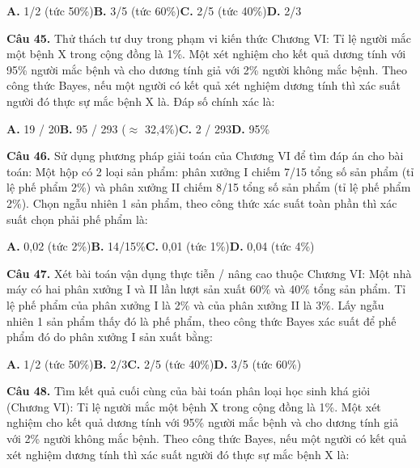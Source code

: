 \documentclass[11pt,a4paper]{article}
\begin{document}
\hspace*{1.5em}\textbf{A.} 1/2 (tức 50\%)\quad\quad \textbf{B.} 3/5 (tức 60\%)\quad\quad \textbf{C.} 2/5 (tức 40\%)\quad\quad \textbf{D.} 2/3\par\vspace{2pt}
\textbf{\color{primary} Câu 45.} Thử thách tư duy trong phạm vi kiến thức Chương VI: Tỉ lệ người mắc một bệnh X trong cộng đồng là 1\%. Một xét nghiệm cho kết quả dương tính với 95\% người mắc bệnh và cho dương tính giả với 2\% người không mắc bệnh. Theo công thức Bayes, nếu một người có kết quả xét nghiệm dương tính thì xác suất người đó thực sự mắc bệnh X là. Đáp số chính xác là:\par
\hspace*{1.5em}\textbf{A.} 19 / 20\quad\quad \textbf{B.} 95 / 293 ($\approx$ 32,4\%)\quad\quad \textbf{C.} 2 / 293\quad\quad \textbf{D.} 95\%\par\vspace{2pt}
\textbf{\color{primary} Câu 46.} Sử dụng phương pháp giải toán của Chương VI để tìm đáp án cho bài toán: Một hộp có 2 loại sản phẩm: phân xưởng I chiếm 7/15 tổng số sản phẩm (tỉ lệ phế phẩm 2\%) và phân xưởng II chiếm 8/15 tổng số sản phẩm (tỉ lệ phế phẩm 2\%). Chọn ngẫu nhiên 1 sản phẩm, theo công thức xác suất toàn phần thì xác suất chọn phải phế phẩm là:\par
\hspace*{1.5em}\textbf{A.} 0,02 (tức 2\%)\quad\quad \textbf{B.} 14/15\%\quad\quad \textbf{C.} 0,01 (tức 1\%)\quad\quad \textbf{D.} 0,04 (tức 4\%)\par\vspace{2pt}
\textbf{\color{primary} Câu 47.} Xét bài toán vận dụng thực tiễn / nâng cao thuộc Chương VI: Một nhà máy có hai phân xưởng I và II lần lượt sản xuất 60\% và 40\% tổng sản phẩm. Tỉ lệ phế phẩm của phân xưởng I là 2\% và của phân xưởng II là 3\%. Lấy ngẫu nhiên 1 sản phẩm thấy đó là phế phẩm, theo công thức Bayes xác suất để phế phẩm đó do phân xưởng I sản xuất bằng:\par
\hspace*{1.5em}\textbf{A.} 1/2 (tức 50\%)\quad\quad \textbf{B.} 2/3\quad\quad \textbf{C.} 2/5 (tức 40\%)\quad\quad \textbf{D.} 3/5 (tức 60\%)\par\vspace{2pt}
\textbf{\color{primary} Câu 48.} Tìm kết quả cuối cùng của bài toán phân loại học sinh khá giỏi (Chương VI): Tỉ lệ người mắc một bệnh X trong cộng đồng là 1\%. Một xét nghiệm cho kết quả dương tính với 95\% người mắc bệnh và cho dương tính giả với 2\% người không mắc bệnh. Theo công thức Bayes, nếu một người có kết quả xét nghiệm dương tính thì xác suất người đó thực sự mắc bệnh X là:\par
\end{document}
